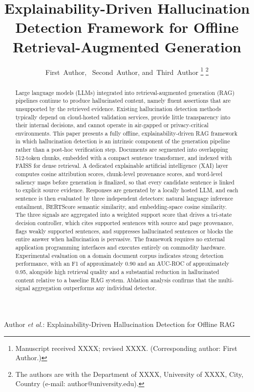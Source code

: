 \documentclass[journal]{IEEEtran}
\begin{document}
\title{Explainability-Driven Hallucination Detection Framework for Offline
Retrieval-Augmented Generation}

\author{First~Author,~
        Second~Author,
        and~Third~Author%
\thanks{Manuscript received XXXX; revised XXXX. (Corresponding author: First Author.)}%
\thanks{The authors are with the Department of XXXX, University of XXXX,
City, Country (e-mail: author@university.edu).}}

%
{Author \MakeLowercase{\textit{et al.}}: Explainability-Driven Hallucination Detection for Offline RAG}

\maketitle

\begin{abstract}
Large language models (LLMs) integrated into retrieval-augmented generation
(RAG) pipelines continue to produce hallucinated content, namely fluent
assertions that are unsupported by the retrieved evidence. Existing
hallucination detection methods typically depend on cloud-hosted validation
services, provide little transparency into their internal decisions, and
cannot operate in air-gapped or privacy-critical environments. This paper
presents a fully offline, explainability-driven RAG framework in which
hallucination detection is an intrinsic component of the generation pipeline
rather than a post-hoc verification step. Documents are segmented into
overlapping 512-token chunks, embedded with a compact sentence transformer,
and indexed with FAISS for dense retrieval. A dedicated explainable
artificial intelligence (XAI) layer computes cosine attribution scores,
chunk-level provenance scores, and word-level saliency maps before generation
is finalized, so that every candidate sentence is linked to explicit source
evidence. Responses are generated by a locally hosted LLM, and each sentence
is then evaluated by three independent detectors: natural language inference
entailment, BERTScore semantic similarity, and embedding-space cosine
similarity. The three signals are aggregated into a weighted support score
that drives a tri-state decision controller, which cites supported sentences
with source and page provenance, flags weakly supported sentences, and
suppresses hallucinated sentences or blocks the entire answer when
hallucination is pervasive. The framework requires no external application
programming interfaces and executes entirely on commodity hardware.
Experimental evaluation on a domain document corpus indicates strong
detection performance, with an F1 of approximately 0.90 and an AUC-ROC of
approximately 0.95, alongside high retrieval quality and a substantial
reduction in hallucinated content relative to a baseline RAG system.
Ablation analysis confirms that the multi-signal aggregation outperforms any
individual detector.
\end{abstract}
\end{document}
